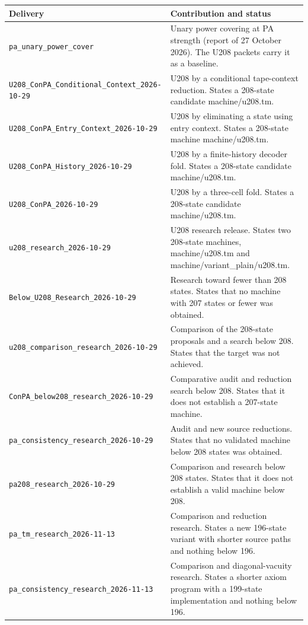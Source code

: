 {\small
\begin{longtable}{p{}p{}}
\toprule Delivery & Contribution and status\\\midrule\endhead
\nolinkurl{pa_unary_power_cover} & Unary power covering at PA strength (report of 27 October 2026). The U208 packets carry it as a baseline.\\[7pt]
\nolinkurl{U208_ConPA_Conditional_Context_2026-10-29} & U208 by a conditional tape-context reduction. States a 208-state candidate machine/u208.tm.\\[7pt]
\nolinkurl{U208_ConPA_Entry_Context_2026-10-29} & U208 by eliminating a state using entry context. States a 208-state machine machine/u208.tm.\\[7pt]
\nolinkurl{U208_ConPA_History_2026-10-29} & U208 by a finite-history decoder fold. States a 208-state candidate machine/u208.tm.\\[7pt]
\nolinkurl{U208_ConPA_2026-10-29} & U208 by a three-cell fold. States a 208-state candidate machine/u208.tm.\\[7pt]
\nolinkurl{u208_research_2026-10-29} & U208 research release. States two 208-state machines, machine/u208.tm and machine/variant\_plain/u208.tm.\\[7pt]
\nolinkurl{Below_U208_Research_2026-10-29} & Research toward fewer than 208 states. States that no machine with 207 states or fewer was obtained.\\[7pt]
\nolinkurl{u208_comparison_research_2026-10-29} & Comparison of the 208-state proposals and a search below 208. States that the target was not achieved.\\[7pt]
\nolinkurl{ConPA_below208_research_2026-10-29} & Comparative audit and reduction search below 208. States that it does not establish a 207-state machine.\\[7pt]
\nolinkurl{pa_consistency_research_2026-10-29} & Audit and new source reductions. States that no validated machine below 208 states was obtained.\\[7pt]
\nolinkurl{pa208_research_2026-10-29} & Comparison and research below 208 states. States that it does not establish a valid machine below 208.\\[7pt]
\nolinkurl{pa_tm_research_2026-11-13} & Comparison and reduction research. States a new 196-state variant with shorter source paths and nothing below 196.\\[7pt]
\nolinkurl{pa_consistency_research_2026-11-13} & Comparison and diagonal-vacuity research. States a shorter axiom program with a 199-state implementation and nothing below 196.\\[7pt]

\end{longtable}}
